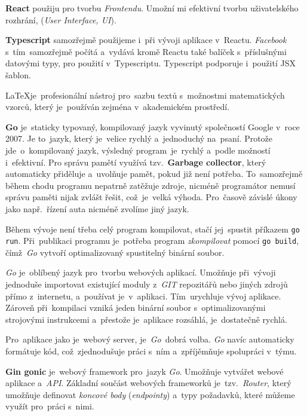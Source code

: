 \documentclass[11pt,a4paper]{report}
\begin{document}
            \textbf{React} použiju pro tvorbu \emph{Frontendu}. Umožní mi efektivní tvorbu uživatelského rozhrání, (\emph{User Interface, UI}).

            \textbf{Typescript} samozřejmě použijeme i~při vývoji aplikace v~Reactu. \emph{Facebook} s~tím~samozřejmě počítá a~vydává
            kromě Reactu také balíček s~příslušnými datovými typy, pro použití v~Typescriptu. Typescript podporuje i~použití JSX šablon. \cite[Refeerence/Handbook/JSX]{TypeScript}

            \LaTeX je~profesionální nástroj pro~sazbu textů s~možnostmi matematických vzorců, který je~používán zejména v~akademickém prostředí.\cite{Rybicka2003:latex}

            \textbf{Go} je~staticky typovaný, kompilovaný jazyk vyvinutý společností Google v~roce 2007. Je to~jazyk, který je~velice rychlý a~jednoduchý na~psaní. Protože jde~o~kompilovaný jazyk, výsledný program~je~rychlý a~podle možností i~efektivní. Pro správu pamětí využívá tzv.~\textbf{Garbage collector}, který automaticky přiděluje a~uvolňuje pamět, pokud již není potřeba. To~samozřejmě během chodu programu nepatrně zatěžuje zdroje, nicméně programátor nemusí správu paměti nijak zvlášt řešit, což~je~velká výhoda. Pro~časově závislé úkony jako např.~řízení auta nicméně zvolíme jiný jazyk. \cite[7.5]{compilers}
            
            Během vývoje není třeba celý program kompilovat, stačí jej~spustit příkazem \texttt{go run}. Při~publikaci programu je~potřeba program \emph{zkompilovat} pomocí \texttt{go build}, čímž~\emph{Go} vytvoří optimalizovaný spustitelný binární soubor.
            
            \emph{Go} je~oblíbený jazyk pro~tvorbu webových aplikací. Umožňuje při~vývoji jednoduše importovat existující moduly z~\emph{GIT} repozitářů nebo jiných zdrojů přímo z~internetu, a~používat je~v~aplikaci. Tím~urychluje vývoj aplikace. Zároveň při~kompilaci vzniká jeden binární soubor s~optimalizovanými strojovými instrukcemi a~přestože je~aplikace rozsáhlá, je~dostatečně rychlá.
            
            Pro~aplikace jako je~webový server, je~\emph{Go}~dobrá volba. \emph{Go} navíc automaticky formátuje kód, což~zjednodušuje práci s~ním a~zpříjěmňuje spolupráci v~týmu.

            \textbf{Gin gonic} je~webový framework pro~jazyk \emph{Go}. Umožňuje vytvářet webové aplikace a~\emph{API}. Základní součást webových frameworků je~tzv.~\emph{Router}, který umožňuje definovat \emph{koncové body} (\emph{endpointy}) a~typy požadavků, které můžeme využít pro~práci s~nimi.
            
\end{document}
